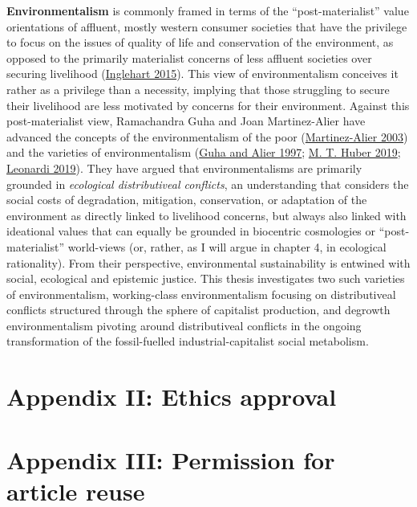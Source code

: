 \documentclass[a4paper, nobind]{templates/ociamthesis}
\begin{document}
\textbf{Environmentalism} is commonly framed in terms of the ``post-materialist'' value orientations of affluent, mostly western consumer societies that have the privilege to focus on the issues of quality of life and conservation of the environment, as opposed to the primarily materialist concerns of less affluent societies over securing livelihood (\protect\hyperlink{ref-inglehart_silent_2015}{Inglehart 2015}). This view of environmentalism conceives it rather as a privilege than a necessity, implying that those struggling to secure their livelihood are less motivated by concerns for their environment. Against this post-materialist view, Ramachandra Guha and Joan Martinez-Alier have advanced the concepts of the environmentalism of the poor (\protect\hyperlink{ref-martinez-alier_environmentalism_2003}{Martinez-Alier 2003}) and the varieties of environmentalism (\protect\hyperlink{ref-guha_varieties_1997}{Guha and Alier 1997}; \protect\hyperlink{ref-huber_ecological_2019}{M. T. Huber 2019}; \protect\hyperlink{ref-leonardi_bringing_2019}{Leonardi 2019}). They have argued that environmentalisms are primarily grounded in \emph{ecological distributiveal conflicts}, an understanding that considers the social costs of degradation, mitigation, conservation, or adaptation of the environment as directly linked to livelihood concerns, but always also linked with ideational values that can equally be grounded in biocentric cosmologies or ``post-materialist'' world-views (or, rather, as I will argue in chapter 4, in ecological rationality). From their perspective, environmental sustainability is entwined with social, ecological and epistemic justice. This thesis investigates two such varieties of environmentalism, working-class environmentalism focusing on distributiveal conflicts structured through the sphere of capitalist production, and degrowth environmentalism pivoting around distributiveal conflicts in the ongoing transformation of the fossil-fuelled industrial-capitalist social metabolism.

\hypertarget{appendix-ii-ethics-approval}{%
\chapter{Appendix II: Ethics approval}\label{appendix-ii-ethics-approval}}



\hypertarget{appendix-iii-permission-for-article-reuse}{%
\chapter{Appendix III: Permission for article reuse}\label{appendix-iii-permission-for-article-reuse}}






\end{document}
